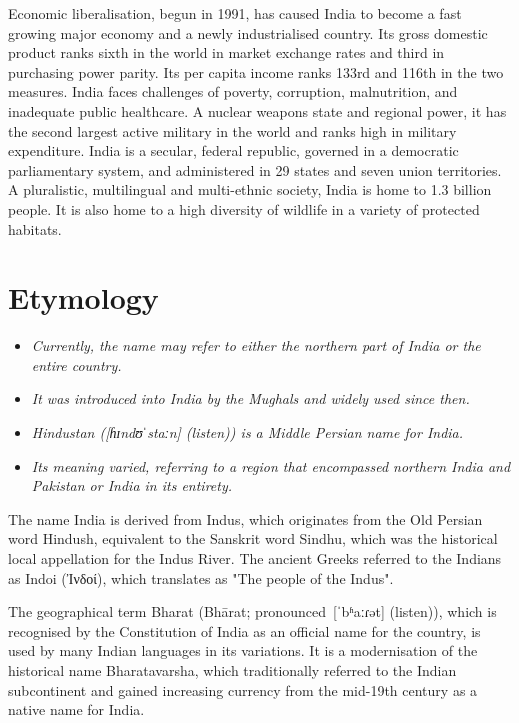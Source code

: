 Economic liberalisation, begun in 1991, has caused India to become a
fast growing major economy and a newly industrialised country. Its gross
domestic product ranks sixth in the world in market exchange rates and
third in purchasing power parity. Its per capita income ranks 133rd and
116th in the two measures. India faces challenges of poverty,
corruption, malnutrition, and inadequate public healthcare. A nuclear
weapons state and regional power, it has the second largest active
military in the world and ranks high in military expenditure. India is a
secular, federal republic, governed in a democratic parliamentary
system, and administered in 29 states and seven union territories. A
pluralistic, multilingual and multi-ethnic society, India is home to 1.3
billion people. It is also home to a high diversity of wildlife in a
variety of protected habitats.

\section{Etymology}\label{etymology}

\begin{itemize}
\item
  \emph{Currently, the name may refer to either the northern part of
  India or the entire country.}
\item
  \emph{It was introduced into India by the Mughals and widely used
  since then.}
\item
  \emph{Hindustan ({[}ɦɪndʊˈstaːn{]} (listen)) is a Middle Persian name
  for India.}
\item
  \emph{Its meaning varied, referring to a region that encompassed
  northern India and Pakistan or India in its entirety.}
\end{itemize}

The name India is derived from Indus, which originates from the Old
Persian word Hindush, equivalent to the Sanskrit word Sindhu, which was
the historical local appellation for the Indus River. The ancient Greeks
referred to the Indians as Indoi (Ἰνδοί), which translates as "The
people of the Indus".

The geographical term Bharat (Bhārat; pronounced~{[}ˈbʱaːɾət{]}
(listen)), which is recognised by the Constitution of India as an
official name for the country, is used by many Indian languages in its
variations. It is a modernisation of the historical name Bharatavarsha,
which traditionally referred to the Indian subcontinent and gained
increasing currency from the mid-19th century as a native name for
India.

